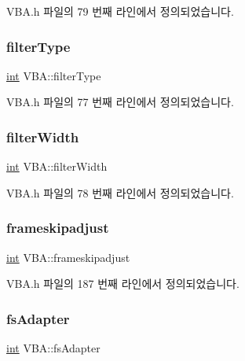 V\+B\+A.\+h 파일의 79 번째 라인에서 정의되었습니다.

\mbox{\label{class_v_b_a_a835f54f74420b21459e0f3ce0eacc20d}} 
\subsubsection{\texorpdfstring{filter\+Type}{filterType}}
{\footnotesize\ttfamily \mbox{\hyperlink{_util_8cpp_a0ef32aa8672df19503a49fab2d0c8071}{int}} V\+B\+A\+::filter\+Type}



V\+B\+A.\+h 파일의 77 번째 라인에서 정의되었습니다.

\mbox{\label{class_v_b_a_a1ae8b3a4ed9fd2a3783868ae5d38c3bc}} 
\subsubsection{\texorpdfstring{filter\+Width}{filterWidth}}
{\footnotesize\ttfamily \mbox{\hyperlink{_util_8cpp_a0ef32aa8672df19503a49fab2d0c8071}{int}} V\+B\+A\+::filter\+Width}



V\+B\+A.\+h 파일의 78 번째 라인에서 정의되었습니다.

\mbox{\label{class_v_b_a_a68ed258ae51274c7dcf72cf866d43733}} 
\subsubsection{\texorpdfstring{frameskipadjust}{frameskipadjust}}
{\footnotesize\ttfamily \mbox{\hyperlink{_util_8cpp_a0ef32aa8672df19503a49fab2d0c8071}{int}} V\+B\+A\+::frameskipadjust}



V\+B\+A.\+h 파일의 187 번째 라인에서 정의되었습니다.

\mbox{\label{class_v_b_a_a7d5755450adf7917d1275965ed2620ce}} 
\subsubsection{\texorpdfstring{fs\+Adapter}{fsAdapter}}
{\footnotesize\ttfamily \mbox{\hyperlink{_util_8cpp_a0ef32aa8672df19503a49fab2d0c8071}{int}} V\+B\+A\+::fs\+Adapter}



